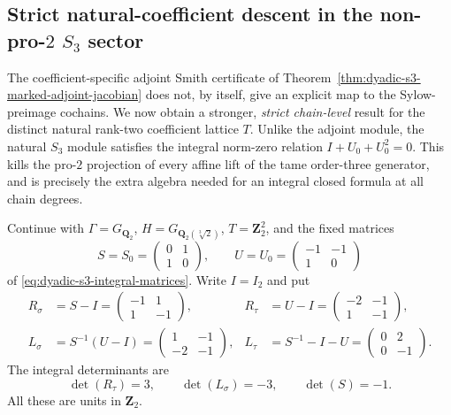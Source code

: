 
\subsection{Strict natural-coefficient descent in the non-pro-$2$ $S_3$ sector}
\label{subsec:dyadic-s3-natural-strict-transfer}

The coefficient-specific adjoint Smith certificate of
Theorem~\ref{thm:dyadic-s3-marked-adjoint-jacobian}
does not, by itself, give an explicit map to the
Sylow-preimage cochains.  We now obtain a stronger,
\emph{strict chain-level} result for the distinct
natural rank-two coefficient lattice $T$.
Unlike the adjoint module, the natural $S_3$ module
satisfies the integral norm-zero relation
$I+U_0+U_0^2=0$.  This kills the pro-$2$
projection of every affine lift of the tame
order-three generator, and is precisely the
extra algebra needed for an integral closed
formula at all chain degrees.

Continue with $\Gamma=G_{\mathbf Q_2}$,
$H=G_{\mathbf Q_2(\sqrt[3]{2})}$,
$T=\mathbf Z_2^2$, and the fixed matrices
\[
S=S_0=\begin{pmatrix}0&1\\1&0\end{pmatrix},
\qquad
U=U_0=\begin{pmatrix}-1&-1\\1&0\end{pmatrix}
\]
of \eqref{eq:dyadic-s3-integral-matrices}.
Write $I=I_2$ and put
\begin{equation}\label{eq:dyadic-s3-natural-tame-blocks}
\begin{aligned}
R_\sigma&=S-I=
\begin{pmatrix}-1&1\\1&-1\end{pmatrix},
&
R_\tau&=U-I=
\begin{pmatrix}-2&-1\\1&-1\end{pmatrix},
\\
L_\sigma&=S^{-1}(U-I)
=\begin{pmatrix}1&-1\\-2&-1\end{pmatrix},
&
L_\tau&=S^{-1}-I-U
=\begin{pmatrix}0&2\\0&-1\end{pmatrix}.
\end{aligned}
\end{equation}
The integral determinants are
\begin{equation}\label{eq:dyadic-s3-natural-unit-dets}
\det(R_\tau)=3,\qquad
\det(L_\sigma)=-3,\qquad
\det(S)=-1.
\end{equation}
All these are units in $\mathbf Z_2$.

